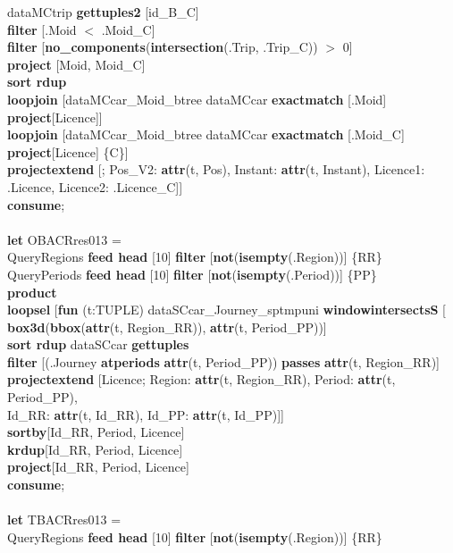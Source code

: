 \documentclass[a4paper]{article}
\newcommand{\op}[1]{\textbf{#1}}
\begin{document}
\begin{scriptsize}
\begin{tabbing}
\>\>dataMCtrip \op{gettuples2} [id\_B\_C]\\
\>\>\op{filter} [.Moid $<$ .Moid\_C]\\
\>\>\op{filter} [\op{no\_components}(\op{intersection}(.Trip, .Trip\_C)) $>$ 0]\\
\>\>\op{project} [Moid, Moid\_C]\\
\>\>\op{sort rdup}\\
\>\>\op{loopjoin} [dataMCcar\_Moid\_btree dataMCcar \op{exactmatch} [.Moid] \op{project}[Licence]]\\
\>\>\op{loopjoin} [dataMCcar\_Moid\_btree dataMCcar \op{exactmatch} [.Moid\_C] \op{project}[Licence] \{C\}]\\
\>\>\op{projectextend} [; Pos\_V2: \op{attr}(t, Pos), Instant: \op{attr}(t, Instant), Licence1: .Licence, Licence2: .Licence\_C]]\\
\op{consume};\\
\\
\op{let} OBACRres013 =\\
\>QueryRegions \op{feed head} [10] \op{filter} [\op{not}(\op{isempty}(.Region))] \{RR\}\\
\>QueryPeriods \op{feed head} [10] \op{filter} [\op{not}(\op{isempty}(.Period))] \{PP\}\\
\>\op{product}\\
\>\op{loopsel} [\op{fun} (t:TUPLE) dataSCcar\_Journey\_sptmpuni \op{windowintersectsS} [\\ 
\>\>\>\op{box3d}(\op{bbox}(\op{attr}(t, Region\_RR)), \op{attr}(t, Period\_PP))]\\
\>\>\op{sort rdup} dataSCcar  \op{gettuples}\\
\>\>\op{filter} [(.Journey \op{atperiods} \op{attr}(t, Period\_PP)) \op{passes} \op{attr}(t, Region\_RR)]\\
\>\>\op{projectextend} [Licence; Region: \op{attr}(t, Region\_RR), Period: \op{attr}(t, Period\_PP),\\
\>\>\>\>Id\_RR: \op{attr}(t, Id\_RR), Id\_PP: \op{attr}(t, Id\_PP)]]\\
\>\op{sortby}[Id\_RR, Period, Licence]\\
\>\op{krdup}[Id\_RR, Period, Licence]\\
\>\op{project}[Id\_RR, Period, Licence]\\
\op{consume};\\
\\
\op{let} TBACRres013 =\\
\>QueryRegions \op{feed head} [10] \op{filter} [\op{not}(\op{isempty}(.Region))] \{RR\}\\

\end{tabbing}
\end{scriptsize}
\end{document}
